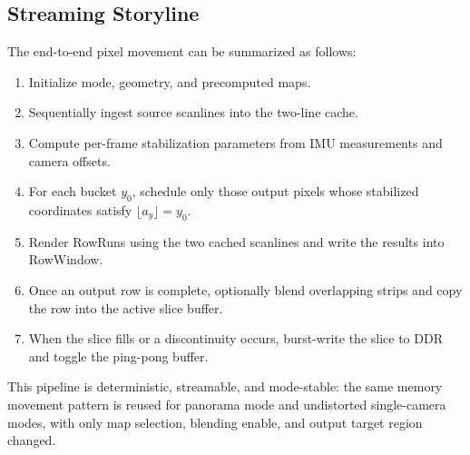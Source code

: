 \documentclass[journal]{IEEEtran}
\begin{document}
\subsection{Streaming Storyline}
The end-to-end pixel movement can be summarized as follows:
\begin{enumerate}[leftmargin=*,itemsep=0pt,topsep=2pt]
  \item Initialize mode, geometry, and precomputed maps.
  \item Sequentially ingest source scanlines into the two-line cache.
  \item Compute per-frame stabilization parameters from IMU measurements and camera offsets.
  \item For each bucket $y_0$, schedule only those output pixels whose stabilized coordinates satisfy $\lfloor a_y \rfloor = y_0$.
  \item Render RowRuns using the two cached scanlines and write the results into RowWindow.
  \item Once an output row is complete, optionally blend overlapping strips and copy the row into the active slice buffer.
  \item When the slice fills or a discontinuity occurs, burst-write the slice to DDR and toggle the ping-pong buffer.
\end{enumerate}

This pipeline is deterministic, streamable, and mode-stable: the same memory movement pattern is reused for panorama mode and undistorted single-camera modes, with only map selection, blending enable, and output target region changed.
\end{document}
